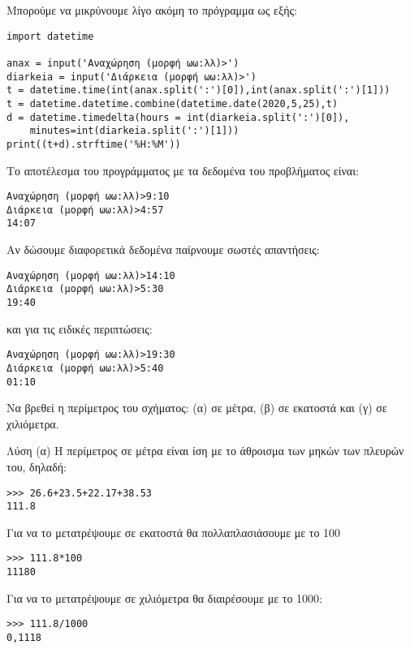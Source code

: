 Μπορούμε να μικρύνουμε λίγο ακόμη το πρόγραμμα ως εξής:
\begin{lstlisting}
import datetime

anax = input('Αναχώρηση (μορφή ωω:λλ)>')
diarkeia = input('Διάρκεια (μορφή ωω:λλ)>')
t = datetime.time(int(anax.split(':')[0]),int(anax.split(':')[1]))
t = datetime.datetime.combine(datetime.date(2020,5,25),t)
d = datetime.timedelta(hours = int(diarkeia.split(':')[0]), 
    minutes=int(diarkeia.split(':')[1]))
print((t+d).strftime('%H:%M'))
\end{lstlisting}

Το αποτέλεσμα του προγράμματος με τα δεδομένα του προβλήματος είναι:
\begin{lstlisting}
Αναχώρηση (μορφή ωω:λλ)>9:10
Διάρκεια (μορφή ωω:λλ)>4:57
14:07
\end{lstlisting}

Αν δώσουμε διαφορετικά δεδομένα παίρνουμε σωστές απαντήσεις:
\begin{lstlisting}
Αναχώρηση (μορφή ωω:λλ)>14:10
Διάρκεια (μορφή ωω:λλ)>5:30
19:40
\end{lstlisting}

και για τις ειδικές περιπτώσεις:
\begin{lstlisting}
Αναχώρηση (μορφή ωω:λλ)>19:30
Διάρκεια (μορφή ωω:λλ)>5:40
01:10
\end{lstlisting}

\begin{exercise}
Να βρεθεί η περίμετρος του σχήματος: (α) σε μέτρα, (β) σε εκατοστά και
(γ) σε χιλιόμετρα.
\end{exercise}
Λύση
(α) Η περίμετρος σε μέτρα είναι ίση με το άθροισμα
των μηκών των πλευρών του, δηλαδή:
\begin{lstlisting}
>>> 26.6+23.5+22.17+38.53
111.8
\end{lstlisting}
Για να το μετατρέψουμε σε εκατοστά θα πολλαπλασιάσουμε με το 100
\begin{lstlisting}
>>> 111.8*100
11180
\end{lstlisting}
Για να το μετατρέψουμε σε χιλιόμετρα θα διαιρέσουμε με το 1000:
\begin{lstlisting}
>>> 111.8/1000
0,1118
\end{lstlisting}


